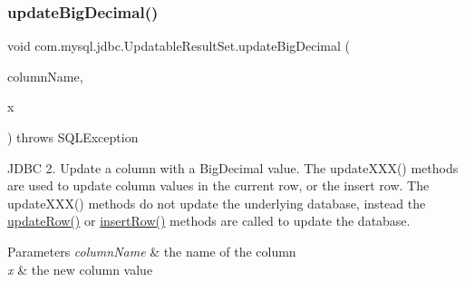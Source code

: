\subsubsection{\texorpdfstring{update\+Big\+Decimal()}{updateBigDecimal()}\hspace{0.1cm}{\footnotesize\ttfamily [2/2]}}
{\footnotesize\ttfamily void com.\+mysql.\+jdbc.\+Updatable\+Result\+Set.\+update\+Big\+Decimal (\begin{DoxyParamCaption}\item[{String}]{column\+Name,  }\item[{Big\+Decimal}]{x }\end{DoxyParamCaption}) throws S\+Q\+L\+Exception}

J\+D\+BC 2. Update a column with a Big\+Decimal value. The update\+X\+X\+X() methods are used to update column values in the current row, or the insert row. The update\+X\+X\+X() methods do not update the underlying database, instead the \mbox{\hyperlink{classcom_1_1mysql_1_1jdbc_1_1_updatable_result_set_a919969ba4b3c7cbc7b18605e9f31a746}{update\+Row()}} or \mbox{\hyperlink{classcom_1_1mysql_1_1jdbc_1_1_updatable_result_set_aef041f8d9d0778083716fc26652648fa}{insert\+Row()}} methods are called to update the database.


\begin{DoxyParams}{Parameters}
{\em column\+Name} & the name of the column \\
\hline
{\em x} & the new column value\\
\hline
\end{DoxyParams}

